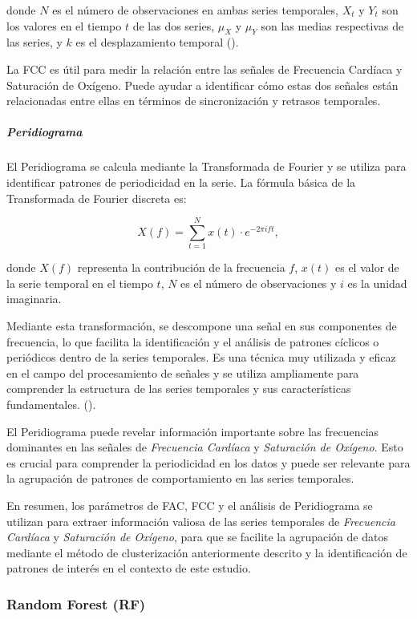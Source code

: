 donde $N$ es el número de observaciones en ambas series temporales, $X_t$ y $Y_t$ son los valores en el tiempo $t$ de las dos series, $\mu_X$ y $\mu_Y$ son las medias respectivas de las series, y $k$ es el desplazamiento temporal (\cite{shumway2017chapter1}).

La FCC es útil para medir la relación entre las señales de Frecuencia Cardíaca y Saturación de Oxígeno. Puede ayudar a identificar cómo estas dos señales están relacionadas entre ellas en términos de sincronización y retrasos temporales.

\subparagraph{Peridiograma}

El Peridiograma se calcula mediante la Transformada de Fourier y se utiliza para identificar patrones de periodicidad en la serie. La fórmula básica de la Transformada de Fourier discreta es:

\[
X(f) = \sum_{t=1}^{N} x(t) \cdot e^{-2\pi i f t}
,\]

donde $X(f)$ representa la contribución de la frecuencia $f$, $x(t)$ es el valor de la serie temporal en el tiempo $t$, $N$ es el número de observaciones y $i$ es la unidad imaginaria. 

Mediante esta transformación, se descompone una señal en sus componentes de frecuencia, lo que facilita la identificación y el análisis de patrones cíclicos o periódicos dentro de la series temporales. Es una técnica muy utilizada y eficaz en el campo del procesamiento de señales y se utiliza ampliamente para comprender la estructura de las series temporales y sus características fundamentales. (\cite{schuster1898investigation}).

El Peridiograma puede revelar información importante sobre las frecuencias dominantes en las señales de \textit{Frecuencia Cardíaca} y \textit{Saturación de Oxígeno}. Esto es crucial para comprender la periodicidad en los datos y puede ser relevante para la agrupación de patrones de comportamiento en las series temporales.

En resumen, los parámetros de FAC, FCC y el análisis de Peridiograma se utilizan para extraer información valiosa de las series temporales de \textit{Frecuencia Cardíaca} y \textit{Saturación de Oxígeno}, para que se facilite la agrupación de datos mediante el método de clusterización anteriormente descrito y la identificación de patrones de interés en el contexto de este estudio.


\subsubsection{Random Forest (RF)}\label{sec:rf}

